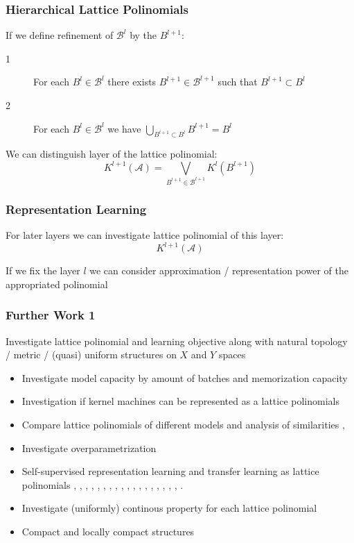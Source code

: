 \documentclass{beamer}
\newcommand {\A}                          {\mathcal{A}}
\newcommand {\B}                          {\mathcal{B}}
\begin{document}
\begin{frame}
    \frametitle{Hierarchical Lattice Polinomials}
        If we define refinement of $\B^{l}$ by the $B^{l+1}$:
        \begin{description}
            \item[1] For each $B^{l} \in \B^{l}$ there exists $B^{l + 1} \in \B^{l + 1}$
            such that $B^{l + 1} \subset B^{l}$
            \item[2] For each $B^{l} \in \B^{l} $ we have 
            $\bigcup_{B^{l + 1} \subset B^{l}}{B^{l + 1}} = B^{l}$
        \end{description}

        We can distinguish layer of the lattice polinomial:
        $$
        K^{l + 1}(\A) = \bigvee_{B^{l+1} \in \B^{l+1}}K^l(B^{l+1})
        $$
\end{frame}

\begin{frame}
    \frametitle{Representation Learning}
    For later layers we can investigate lattice polinomial of this layer:
    $$
    K^{l + 1}(\A)
    $$

    If we fix the layer $l$ we can consider approximation / representation power
    of the appropriated polinomial
\end{frame}

\begin{frame}
    \frametitle{Further Work 1}
    Investigate lattice polinomial and learning objective 
    along with natural topology / metric / (quasi) uniform structures 
    on $X$ and $Y$ spaces
    \begin{itemize}
        \item Investigate model capacity by amount of batches 
        and memorization capacity \cite{RandLabs} 
        \item Investigation if kernel machines can be represented as a lattice polinomials
        \item Compare lattice polinomials of different models and analysis of similarities
        \cite{NNKernalMach}, \cite{NNKerLearn}
        \item Investigate overparametrization \cite{NNOverparam}
        \item Self-supervised representation learning and transfer learning 
        as lattice polinomials \cite{PerSal}, \cite{PanYang}, \cite{FurZhan}, \cite{ChenKorbin},
        \cite{HeWe}, \cite{OordLi}, \cite{GrillFlor}, \cite{DevlChang}, \cite{LiuOtt},
        \cite{VelicFedus}, \cite{GroverLesk}, \cite{KipfWell}, \cite{ZhuXu}, \cite{LiuZhang}, 
        \cite{JaisBabu}, \cite{XieXu}, \cite{WuLin}, \cite{YouChen}, \cite{ThakCor}.
        \item Investigate (uniformly) continous property for each lattice polinomial
        \item Compact and locally compact structures
    \end{itemize}
\end{frame}
\end{document}
